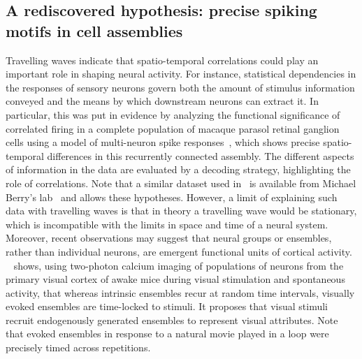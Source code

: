 \documentclass[brainsci, %
               review,submit,pdftex,moreauthors
               ]{Definitions/mdpi}
\begin{document}
\subsection{A rediscovered hypothesis: precise spiking motifs in cell assemblies}
Travelling waves indicate that spatio-temporal correlations could play an important role in shaping neural activity. For instance, statistical dependencies in the responses of sensory neurons govern both the amount of stimulus information conveyed and the means by which downstream neurons can extract it. In particular, this was put in evidence by analyzing the functional significance of correlated firing in a complete population of macaque parasol retinal ganglion cells using a model of multi-neuron spike responses~\citep{pillow_spatio-temporal_2008}, which shows precise spatio-temporal differences in this recurrently connected assembly. The different aspects of information in the data are evaluated by a decoding strategy, highlighting the role of correlations. Note that a similar dataset used in~\citep{schneidman_weak_2006} is available from Michael Berry's lab~\citep{berry_spike_2022} and allows  these hypotheses. However, a limit of explaining such data with travelling waves is that in theory a  travelling wave would be stationary, which is incompatible with the limits in space and time of a neural system. Moreover, recent observations may suggest that neural groups or ensembles, rather than individual neurons, are emergent functional units of cortical activity. ~\cite{miller_visual_2014} shows, using two-photon calcium imaging of populations of neurons from the primary visual cortex of awake mice during visual stimulation and spontaneous activity, that whereas intrinsic ensembles recur at random time intervals, visually evoked ensembles are time-locked to stimuli. It proposes that visual stimuli recruit endogenously generated ensembles to represent visual attributes. Note that evoked ensembles in response to a natural movie played in a loop were precisely timed across repetitions. %
\end{document}
